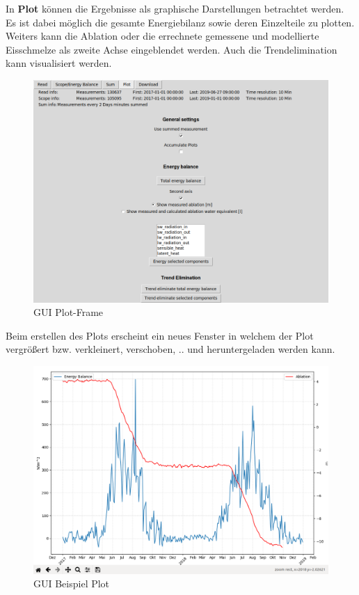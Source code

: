 \documentclass[12pt,a4paper]{article}
\begin{document}
In \textbf{Plot} können die Ergebnisse als graphische Darstellungen betrachtet werden. Es ist dabei möglich die gesamte Energiebilanz sowie deren Einzelteile zu plotten. Weiters kann die Ablation oder die errechnete gemessene und modellierte Eisschmelze als zweite Achse eingeblendet werden. Auch die Trendelimination kann visualisiert werden.

\begin{figure}[H]
\centering
\includegraphics[width=1\textwidth]{pictures/GUI/Plot_Frame.png}
\caption{GUI Plot-Frame}
\label{fig:GUI Plot-Frame}
\end{figure}

Beim erstellen des Plots erscheint ein neues Fenster in welchem der Plot vergrößert bzw. verkleinert, verschoben, .. und heruntergeladen werden kann.

\begin{figure}[H]
\centering
\includegraphics[width=1\textwidth]{pictures/GUI/Sample_Plot.png}
\caption{GUI Beispiel Plot}
\label{fig:GUI Beispiel Plot}
\end{figure}
\end{document}
